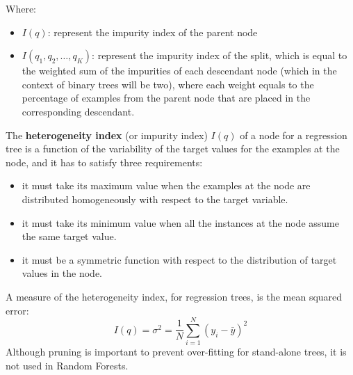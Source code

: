 Where: 
\begin{itemize}
    \item $I(q)$: represent the impurity index of the parent node
    \item $I(q_1, q_2, \ldots, q_K)$: represent the impurity index of the split, which is equal to the weighted sum of the impurities of each descendant node (which in the context of binary trees will be two), where each weight equals to the percentage of examples from the parent node that are placed in the corresponding descendant.  
\end{itemize}

The \textbf{heterogeneity index} (or impurity index) $I(q)$ of a node for a regression tree is a function of the variability of the target values for the examples at the node, and it has to satisfy three requirements: 
\begin{itemize}
    \item it must take its maximum value when the examples at the node are distributed homogeneously with respect to the target variable.
    \item it must take its minimum value when all the instances at the node assume the same target value.
    \item it must be a symmetric function with respect to the distribution of target values in the node.
\end{itemize}

A measure of the heterogeneity index, for regression trees, is the mean squared error: 
\begin{equation}
    I(q) = \sigma^2 = \frac{1}{N} \sum_{i=1}^{N} (y_i - \bar{y})^2
\end{equation}
Although pruning is important to prevent over-fitting for stand-alone trees, it is not used in Random Forests.


